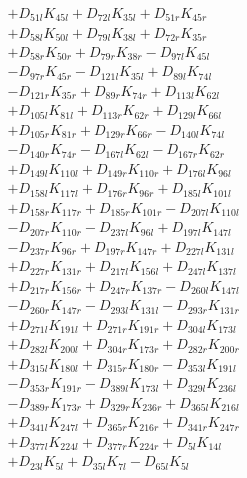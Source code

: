 \begin{multicols}{2}
\begin{align}
&+ D_{51l}K_{45l} + D_{72l}K_{35l} + D_{51r}K_{45r}  \nonumber \\
&+ D_{58l}K_{50l} + D_{79l}K_{38l} + D_{72r}K_{35r}  \nonumber \\
&+ D_{58r}K_{50r} + D_{79r}K_{38r} - D_{97l}K_{45l}  \nonumber \\
&- D_{97r}K_{45r} - D_{121l}K_{35l} + D_{89l}K_{74l}  \nonumber \\
&- D_{121r}K_{35r} + D_{89r}K_{74r} + D_{113l}K_{62l}  \nonumber \\
&+ D_{105l}K_{81l} + D_{113r}K_{62r} + D_{129l}K_{66l}  \nonumber \\
&+ D_{105r}K_{81r} + D_{129r}K_{66r} - D_{140l}K_{74l}  \nonumber \\
&- D_{140r}K_{74r} - D_{167l}K_{62l} - D_{167r}K_{62r}  \nonumber \\
&+ D_{149l}K_{110l} + D_{149r}K_{110r} + D_{176l}K_{96l}  \nonumber \\
&+ D_{158l}K_{117l} + D_{176r}K_{96r} + D_{185l}K_{101l}  \nonumber \\
&+ D_{158r}K_{117r} + D_{185r}K_{101r} - D_{207l}K_{110l}  \nonumber \\
&- D_{207r}K_{110r} - D_{237l}K_{96l} + D_{197l}K_{147l}  \nonumber \\
&- D_{237r}K_{96r} + D_{197r}K_{147r} + D_{227l}K_{131l}  \nonumber \\
&+ D_{227r}K_{131r} + D_{217l}K_{156l} + D_{247l}K_{137l}  \nonumber \\
&+ D_{217r}K_{156r} + D_{247r}K_{137r} - D_{260l}K_{147l}  \nonumber \\
&- D_{260r}K_{147r} - D_{293l}K_{131l} - D_{293r}K_{131r}  \nonumber \\
&+ D_{271l}K_{191l} + D_{271r}K_{191r} + D_{304l}K_{173l}  \nonumber \\
&+ D_{282l}K_{200l} + D_{304r}K_{173r} + D_{282r}K_{200r}  \nonumber \\
&+ D_{315l}K_{180l} + D_{315r}K_{180r} - D_{353l}K_{191l}  \nonumber \\
&- D_{353r}K_{191r} - D_{389l}K_{173l} + D_{329l}K_{236l}  \nonumber \\
&- D_{389r}K_{173r} + D_{329r}K_{236r} + D_{365l}K_{216l}  \nonumber \\
&+ D_{341l}K_{247l} + D_{365r}K_{216r} + D_{341r}K_{247r}  \nonumber \\
&+ D_{377l}K_{224l} + D_{377r}K_{224r} + D_{5l}K_{14l}  \nonumber \\
&+ D_{23l}K_{5l} + D_{35l}K_{7l} - D_{65l}K_{5l}  \nonumber \\

\end{align}
\end{multicols}
